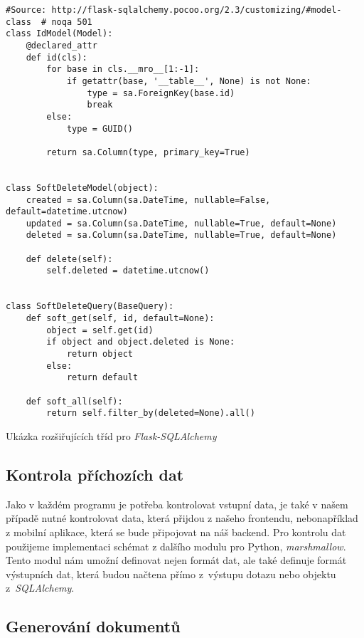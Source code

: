 \begin{listing}[H]
    \begin{verbatim}
#Source: http://flask-sqlalchemy.pocoo.org/2.3/customizing/#model-class  # noqa 501
class IdModel(Model):
    @declared_attr
    def id(cls):
        for base in cls.__mro__[1:-1]:
            if getattr(base, '__table__', None) is not None:
                type = sa.ForeignKey(base.id)
                break
        else:
            type = GUID()

        return sa.Column(type, primary_key=True)


class SoftDeleteModel(object):
    created = sa.Column(sa.DateTime, nullable=False, default=datetime.utcnow)
    updated = sa.Column(sa.DateTime, nullable=True, default=None)
    deleted = sa.Column(sa.DateTime, nullable=True, default=None)

    def delete(self):
        self.deleted = datetime.utcnow()


class SoftDeleteQuery(BaseQuery):
    def soft_get(self, id, default=None):
        object = self.get(id)
        if object and object.deleted is None:
            return object
        else:
            return default

    def soft_all(self):
        return self.filter_by(deleted=None).all()
    \end{verbatim}
    \caption{Ukázka rozšiřujících tříd pro \textit{Flask-SQLAlchemy}}
    \label{lst:sqlalchemyExtensions}
\end{listing}

\subsection{Kontrola příchozích dat}

Jako v každém programu je potřeba kontrolovat vstupní data, je také v našem případě nutné kontrolovat data, která přijdou z našeho frontendu, nebo\linebreak například z mobilní aplikace,
která se bude připojovat na náš backend. Pro kontrolu dat použijeme implementaci schémat z dalšího modulu pro Python, \textit{marshmallow}. Tento modul nám umožní definovat
nejen formát dat, ale také definuje formát výstupních dat, která budou načtena přímo z~výstupu dotazu nebo objektu z~\textit{SQLAlchemy}.

\subsection{Generování dokumentů}

